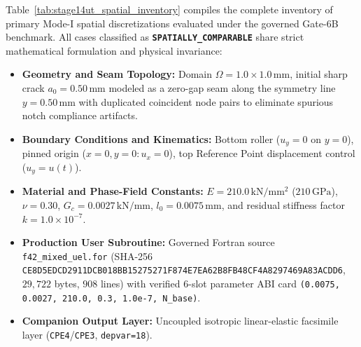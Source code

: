 Table~\ref{tab:stage14ut_spatial_inventory} compiles the complete inventory of primary Mode-I spatial discretizations evaluated under the governed Gate-6B benchmark. All cases classified as \textbf{\texttt{SPATIALLY\_COMPARABLE}} share strict mathematical formulation and physical invariance:
\begin{itemize}
    \item \textbf{Geometry and Seam Topology:} Domain $\Omega = 1.0\times 1.0\,\mathrm{mm}$, initial sharp crack $a_0 = 0.50\,\mathrm{mm}$ modeled as a zero-gap seam along the symmetry line $y = 0.50\,\mathrm{mm}$ with duplicated coincident node pairs to eliminate spurious notch compliance artifacts.
    \item \textbf{Boundary Conditions and Kinematics:} Bottom roller ($u_y = 0$ on $y=0$), pinned origin ($x=0, y=0: u_x=0$), top Reference Point displacement control ($u_y = u(t)$).
    \item \textbf{Material and Phase-Field Constants:} $E = 210.0\,\mathrm{kN/mm^2}$ ($210\,\mathrm{GPa}$), $\nu = 0.30$, $G_c = 0.0027\,\mathrm{kN/mm}$, $l_0 = 0.0075\,\mathrm{mm}$, and residual stiffness factor $k = 1.0\times 10^{-7}$.
    \item \textbf{Production User Subroutine:} Governed Fortran source \texttt{f42\_mixed\_uel.for} (SHA-256 \texttt{CE8D5EDCD2911DCB018BB15275271F874E7EA62B8FB48CF4A8297469A83ACDD6}, $29{,}722$ bytes, $908$ lines) with verified 6-slot parameter ABI card \texttt{(0.0075, 0.0027, 210.0, 0.3, 1.0e-7, N\_base)}.
    \item \textbf{Companion Output Layer:} Uncoupled isotropic linear-elastic facsimile layer (\texttt{CPE4}/\texttt{CPE3}, \texttt{depvar=18}).
\end{itemize}

